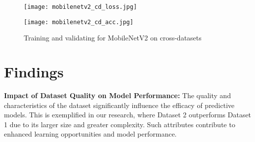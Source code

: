 \documentclass[rebuttal]{cvpr}
\begin{document}


\begin{figure*}[t]
\centering
\begin{minipage}{0.45\linewidth}
   \texttt{[image: mobilenetv2\_cd\_loss.jpg]}
   \label{fig:image1}
\end{minipage}
\hfill
\begin{minipage}{0.45\linewidth}
   \texttt{[image: mobilenetv2\_cd\_acc.jpg]}
   \label{fig:image2}
\end{minipage}
\caption{Training and validating for MobileNetV2 on cross-datasets}
\label{fig:dataset}
\end{figure*}

\section{Findings}
\textbf{Impact of Dataset Quality on Model Performance:} The quality and characteristics of the dataset significantly influence the efficacy of predictive models. This is exemplified in our research, where Dataset 2 outperforms Dataset 1 due to its larger size and greater complexity. Such attributes contribute to enhanced learning opportunities and model performance.\\
\end{document}
